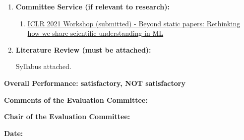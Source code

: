 \documentclass[11pt]{article}
\begin{document}
\begin{enumerate}
        \item \textbf{Committee Service (if relevant to research):}

        \begin{enumerate}
            \item \href{https://newpapers.github.io/}{ICLR 2021 Workshop (submitted) - Beyond static papers: Rethinking how we share scientific understanding in ML}
        \end{enumerate}

        \item \textbf{Literature Review  (must be attached):}

        Syllabus attached.

    \end{enumerate}

    \bigskip

    \newpage
    \textbf{Overall Performance: \qquad satisfactory\underline{\hspace{20mm}},
    \qquad NOT satisfactory\underline{\hspace{20mm}}}

    \bigskip
    \textbf{Comments of the Evaluation Committee:}

    \bigskip

    \vspace{100mm}


    \textbf{Chair of the  Evaluation Committee:}
    \bigskip

    \textbf{Date:} %
\end{document}
